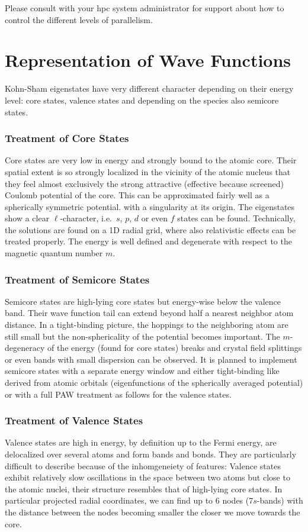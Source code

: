 \documentclass[oribibl]{llncs}
\begin{document}
Please consult with your \ac{hpc} system administrator for support
about how to control the different levels of parallelism.

\section{Representation of Wave Functions}

Kohn-Sham eigenstates have very different character depending on their energy level: core states, valence states and depending on the species also semicore states.
\subsubsection{Treatment of Core States}
Core states are very low in energy and strongly bound 
to the atomic core. 
Their spatial extent is so strongly localized 
in the vicinity of the atomic nucleus 
that they feel almost exclusively the strong attractive 
(effective because screened) Coulomb potential of the core. 
This can be approximated fairly well as a spherically symmetric potential.
with a singularity at its origin.
The eigenstates show a clear $\ell$-character, 
i.e.~$s$, $p$, $d$ or even $f$ states can be found.
Technically, the solutions are found on a 1D radial grid,
where also relativistic effects can be treated properly.
The energy is well defined and degenerate with respect to
the magnetic quantum number $m$.

\subsubsection{Treatment of Semicore States}
Semicore states are high-lying core states
but energy-wise below the valence band.
Their wave function tail can extend beyond half a nearest neighbor atom distance.
In a tight-binding picture, the hoppings to the neighboring atom are still small
but the non-sphericality of the potential becomes important.
The $m$-degeneracy of the energy (found for core states) breaks 
and crystal field splittings or even bands with small dispersion can be observed.
It is planned to implement semicore states with a separate energy window
and either tight-binding like derived from atomic orbitals 
(eigenfunctions of the spherically averaged potential) 
or with a full \ac{PAW} treatment as follows for the valence states.

\subsubsection{Treatment of Valence States}
Valence states are high in energy, by definition up to the Fermi
energy, are delocalized over several atoms and form bands and bonds.
They are particularly difficult to describe because of the 
inhomgeneiety of features:
Valence states exhibit relatively slow oscillations 
in the space between two atoms but close to the atomic nuclei,
their structure resembles that of high-lying core states.
In particular projected radial coordinates, we can find up to $6$ nodes
(7$s$-bands) with the distance between the nodes becoming smaller
the closer we move towards the core.
\end{document}
